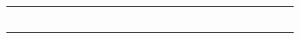\documentclass[12pt,a4paper]{article}
\begin{document}
\begin{landscape}
\begin{table}[ht!]
\begin{tabular}{|l|l|l|l|l|l|l|l|l|l|l|l|l|l|l|l|l|l|l|l|l|l|l|l|l|l|}
		 &                                          &    &    &    &    &    &    &    &    &     &     &     &     &     &     &     &     &     &     &     &           \\\hline
		 &                                          &    &    &    &    &    &    &    &    &     &     &     &     &     &     &     &     &     &     &     &           \\\hline
		 &                                          &    &    &    &    &    &    &    &    &     &     &     &     &     &     &     &     &     &     &     &           \\\hline
		 &                                          &    &    &    &    &    &    &    &    &     &     &     &     &     &     &     &     &     &     &     &           \\\hline
		 &                                          &    &    &    &    &    &    &    &    &     &     &     &     &     &     &     &     &     &     &     &           \\\hline
		 &                                          &    &    &    &    &    &    &    &    &     &     &     &     &     &     &     &     &     &     &     &           \\\hline
		 &                                          &    &    &    &    &    &    &    &    &     &     &     &     &     &     &     &     &     &     &     &           \\\hline
		\end{tabular}
	\end{table}
\end{landscape}
\end{document}
